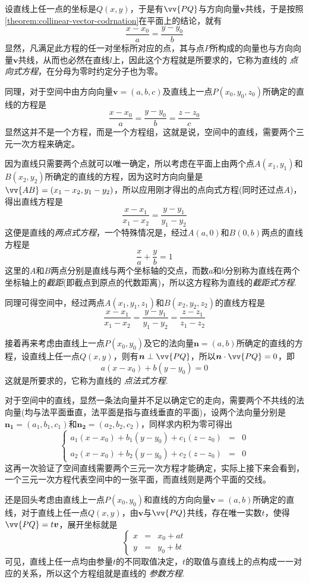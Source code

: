 设直线上任一点的坐标是$Q(x,y)$，于是有$\vv{PQ}$与方向向量$\bm{v}$共线，于是按照\autoref{theorem:collinear-vector-codrnation}在平面上的结论，就有
\[ \frac{x-x_0}{a} = \frac{y-y_0}{b} \]
显然，凡满足此方程的任一对坐标所对应的点，其与点$P$所构成的向量也与方向向量$\bm{v}$共线，从而也必然在直线$l$上，因此这个方程就是所要求的，它称为直线的 \emph{点向式方程}，在分母为零时约定分子也为零。

同理，对于空间中由方向向量$\bm{v}=(a,b,c)$及直线上一点$P(x_0,y_0,z_0)$所确定的直线的方程是
\[ \frac{x-x_0}{a} = \frac{y-y_0}{b} = \frac{z-z_0}{c} \]
显然这并不是一个方程，而是一个方程组，这就是说，空间中的直线，需要两个三元一次方程来确定。

因为直线只需要两个点就可以唯一确定，所以考虑在平面上由两个点$A(x_1,y_1)$和$B(x_2,y_2)$所确定的直线的方程，因为这时方向向量是$\vv{AB}=(x_1-x_2,y_1-y_2)$，所以应用刚才得出的点向式方程(同时还过点$A$)，得出直线方程是
\[ \frac{x-x_1}{x_1-x_2} = \frac{y-y_1}{y_1-y_2} \]
这便是直线的\emph{两点式方程}，一个特殊情况是，经过$A(a,0)$和$B(0,b)$两点的直线方程是
\[ \frac{x}{a}+\frac{y}{b}=1 \]
这里的$A$和$B$两点分别是直线与两个坐标轴的交点，而数$a$和$b$分别称为直线在两个坐标轴上的\emph{截距}(即截点到原点的代数距离)，所以这方程称为直线的\emph{截距式方程}.

同理可得空间中，经过两点$A(x_1,y_1,z_1)$和$B(x_2,y_2,z_2)$的直线方程是
\[ \frac{x-x_1}{x_1-x_2} = \frac{y-y_1}{y_1-y_2} = \frac{z-z_1}{z_1-z_2} \]

接着再来考虑由直线上一点$P(x_0,y_0)$及它的法向量$\bm{n}=(a,b)$所确定的直线的方程，设直线上任一点$Q(x,y)$，则有$\bm{n} \perp \vv{PQ}$，所以$\bm{n} \cdot \vv{PQ} = 0$，即
\[ a(x-x_0)+b(y-y_0)=0 \]
这就是所要求的，它称为直线的 \emph{点法式方程}.

对于空间中的直线，显然一条法向量并不足以确定它的走向，需要两个不共线的法向量(均与法平面垂直，法平面是指与直线垂直的平面)，设两个法向量分别是$\bm{n_1}=(a_1,b_1,c_1)$和$\bm{n_2}=(a_2,b_2,c_2)$，同样求内积为零可得出
\[ \left\{
    \begin{array}{lll}
      a_1(x-x_0) + b_1(y-y_0) + c_1(z-z_0) & = & 0 \\
      a_2(x-x_0) + b_2(y-y_0) + c_2(z-z_0) & = & 0
    \end{array}
  \right. \]
这再一次验证了空间直线需要两个三元一次方程才能确定，实际上接下来会看到，一个三元一次方程代表空间中的一张平面，而直线则是两个平面的交线。

还是回头考虑由直线上一点$P(x_0,y_0)$和直线的方向向量$\bm{v}=(a,b)$所确定的直线，对于直线上任一点$Q(x,y)$，由$\bm{v}$与$\vv{PQ}$共线，存在唯一实数$t$，使得$\vv{PQ}=t\bm{v}$，展开坐标就是
\[ \left\{
    \begin{array}{lll}
      x & = & x_0 + at \\
      y & = & y_0 + bt
    \end{array}
  \right. \]
可见，直线上任一点均由参量$t$的不同取值决定，$t$的取值与直线上的点构成一一对应的关系，所以这个方程组就是直线的 \emph{参数方程}.

